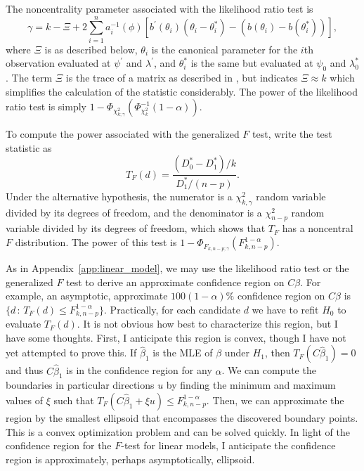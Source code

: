\documentclass[12pt]{article}
\begin{document}
The noncentrality parameter associated with the likelihood ratio test is
\begin{displaymath}
   \gamma = k - \Xi + 2 \sum_{i=1}^n a_i^{-1}(\phi) \left[ b^\prime (\theta_i) \left( \theta_i - \theta_i^* \right) - \left( b(\theta_i) - b(\theta_i^*) \right) \right],
\end{displaymath}
where $\Xi$ is as described below, $\theta_i$ is the canonical parameter for the $i$th observation evaluated at $\psi^\prime$ and $\lambda^\prime$, and $\theta_i^*$ is the same but evaluated at $\psi_0$ and $\lambda_0^*$. The term $\Xi$ is the trace of a matrix as described in \cite{SMO:92}, but \cite{Shieh:00} indicates $\Xi \approx k$ which simplifies the calculation of the statistic considerably. The power of the likelihood ratio test is simply $1 - \Phi_{\chi_{k;\gamma}^2}\left( \Phi_{\chi_k^2}^{-1} ( 1 - \alpha ) \right)$.

To compute the power associated with the generalized $F$ test, write the test statistic as
\begin{displaymath}
   T_F(d) = \frac{(D_0^* - D_1^*) / k}{D_1^* / (n-p)}.
\end{displaymath}
Under the alternative hypothesis, the numerator is a $\chi_{k, \gamma}^2$ random variable divided by its degrees of freedom, and the denominator is a $\chi_{n-p}^2$ random variable divided by its degrees of freedom, which shows that $T_F$ has a noncentral $F$ distribution. The power of this test is $1 - \Phi_{F_{k, n-p; \gamma}}(F_{k, n-p}^{1 - \alpha})$.

As in Appendix~\ref{app:linear_model}, we may use the likelihood ratio test or the generalized $F$ test to derive an approximate confidence region on $C\beta$. For example, an asymptotic, approximate $100(1-\alpha)\%$ confidence region on $C\beta$ is $\{ d \, : \, T_F(d) \leq F_{k, n-p}^{1 - \alpha} \}$. Practically, for each candidate $d$ we have to refit $H_0$ to evaluate $T_F(d)$. It is not obvious how best to characterize this region, but I have some thoughts. First, I anticipate this region is convex, though I have not yet attempted to prove this. If $\hat{\beta}_1$ is the MLE of $\beta$ under $H_1$, then $T_F(C \hat{\beta}_1) = 0$ and thus $C \hat{\beta}_1$ is in the confidence region for any $\alpha$. We can compute the boundaries in particular directions $u$ by finding the minimum and maximum values of $\xi$ such that $T_F(C \hat{\beta}_1 + \xi u) \leq F_{k, n-p}^{1 - \alpha}$. Then, we can approximate the region by the smallest ellipsoid that encompasses the discovered boundary points. This is a convex optimization problem and can be solved quickly. In light of the confidence region for the $F$-test for linear models, I anticipate the confidence region is approximately, perhaps asymptotically, ellipsoid.
\end{document}

